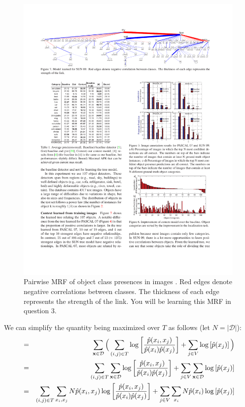 \documentclass{article}
\begin{document}
\begin{enumerate}
\begin{figure}[t]
\includegraphics[width=5.8in]{object_recognition_in_context2}
\vspace{-8mm}
\caption{Pairwise MRF of object class presences in images \cite{choi_cvpr10}. Red edges denote negative correlations between classes. The thickness of each edge represents the strength of the link. You will be learning this MRF in question 3.\label{fig:object_rec2}}
\end{figure}
We can simplify the quantity being maximized over $T$ as follows (let $N=|\mathcal{D}|$):
\begin{eqnarray*}
&=&\sum_{{\bf x}\in \mathcal{D}} \Big(
\sum_{(i,j)\in T}\log\left[\frac{\hat{p}(x_i,x_j)}{\hat{p}(x_i)\hat{p}(x_j)}\right] + \sum_{j\in V}\log\left[ \hat{p}(x_j)\right]\Big)  \\
&=&\sum_{(i,j)\in T}\sum_{{\bf x}\in \mathcal{D}} \log\left[\frac{\hat{p}(x_i,x_j)}{\hat{p}(x_i)\hat{p}(x_j)}\right] + \sum_{j\in V}\sum_{{\bf x}\in \mathcal{D}}\log\left[ \hat{p}(x_j)\right]  \\
&=&\sum_{(i,j)\in T}\sum_{x_i, x_j}N\hat{p}(x_i, x_j) \log\left[\frac{\hat{p}(x_i,x_j)}{\hat{p}(x_i)\hat{p}(x_j)}\right] + \sum_{j\in V} \sum_{x_i}N\hat{p}(x_i) \log\left[ \hat{p}(x_j)\right]  \\

\end{eqnarray*}
\end{enumerate}
\end{document}
